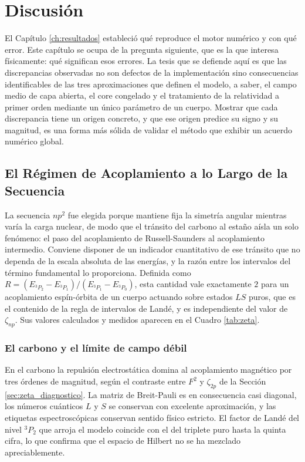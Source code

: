 \chapter{Discusión}
\label{ch:discusion}

El Capítulo \ref{ch:resultados} estableció qué reproduce el motor numérico y con qué error. Este capítulo se ocupa de la pregunta siguiente, que es la que interesa físicamente: qué significan esos errores. La tesis que se defiende aquí es que las discrepancias observadas no son defectos de la implementación sino consecuencias identificables de las tres aproximaciones que definen el modelo, a saber, el campo medio de capa abierta, el core congelado y el tratamiento de la relatividad a primer orden mediante un único parámetro de un cuerpo. Mostrar que cada discrepancia tiene un origen concreto, y que ese origen predice su signo y su magnitud, es una forma más sólida de validar el método que exhibir un acuerdo numérico global.

\section{El Régimen de Acoplamiento a lo Largo de la Secuencia}

La secuencia $np^2$ fue elegida porque mantiene fija la simetría angular mientras varía la carga nuclear, de modo que el tránsito del carbono al estaño aísla un solo fenómeno: el paso del acoplamiento de Russell-Saunders al acoplamiento intermedio. Conviene disponer de un indicador cuantitativo de ese tránsito que no dependa de la escala absoluta de las energías, y la razón entre los intervalos del término fundamental lo proporciona. Definida como $R = (E_{^3P_2} - E_{^3P_1})/(E_{^3P_1} - E_{^3P_0})$, esta cantidad vale exactamente $2$ para un acoplamiento espín-órbita de un cuerpo actuando sobre estados $LS$ puros, que es el contenido de la regla de intervalos de Landé, y es independiente del valor de $\zeta_{np}$. Sus valores calculados y medidos aparecen en el Cuadro \ref{tab:zeta}.

\subsection{El carbono y el límite de campo débil}

En el carbono la repulsión electrostática domina al acoplamiento magnético por tres órdenes de magnitud, según el contraste entre $F^2$ y $\zeta_{2p}$ de la Sección \ref{sec:zeta_diagnostico}. La matriz de Breit-Pauli es en consecuencia casi diagonal, los números cuánticos $L$ y $S$ se conservan con excelente aproximación, y las etiquetas espectroscópicas conservan sentido físico estricto. El factor de Landé del nivel $^3P_2$ que arroja el modelo coincide con el del triplete puro hasta la quinta cifra, lo que confirma que el espacio de Hilbert no se ha mezclado apreciablemente.

